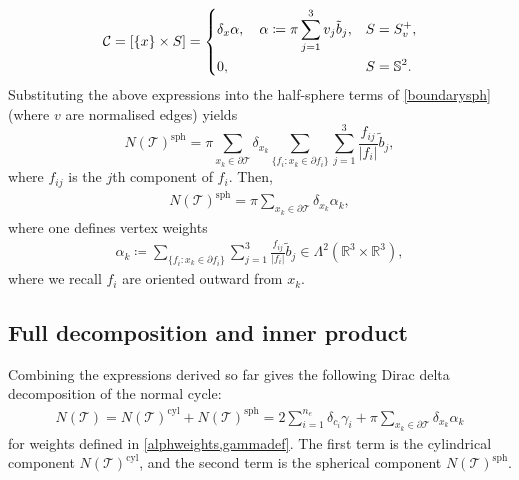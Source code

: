 \documentclass[sn-mathphys-num]{sn-jnl}%
\theoremstyle{thmstyleone}%
\theoremstyle{thmstyletwo}%
\theoremstyle{thmstylethree}%
\numberwithin{remark}{section}
\numberwithin{definition}{section}
\numberwithin{equation}{section}
\numberwithin{theorem}{section}
\newcommand{\R}{\ensuremath{\mathbb{R}}}%
\begin{document}
\begin{gather*}
    \mathcal{C} = [\{x\}\times S] = \begin{dcases}
        \delta_{x}\alpha ,\quad \alpha\coloneq \pi \sum_{j=1}^{3}v_{j}\tilde{b}_{j}, & S=S_{v}^{+},\\ 0 , & S=\mathbb{S}^{2}.
		 \end{dcases} 
\end{gather*}
 Substituting the above expressions into the half-sphere terms of \cref{boundarysph} (where $v$ are normalised edges) yields
\[
N(\mathcal{T})^{\mathrm{sph}} = \pi\sum_{x_{k} \in \partial \mathcal{T }}\delta_{x_{k}} \sum_{\{f_{i}\colon x_k\in \partial f_i\}}\sum_{j=1}^{3}{\frac{f_{ij}}{\lvert f_{i} \rvert} }\tilde{b}_{j}, 
\]
where $f_{ij}$ is the $j$th component of $f_i$. Then,
\begin{align*}
  N(\mathcal{T})^{\mathrm{sph}}  =  \pi\sum_{x_{k} \in \partial \mathcal{T }}\delta_{x_{k}}{\alpha_{k}} ,
\end{align*}
where one defines vertex weights
\begin{align}\label{alphweights}
\alpha_{k} \coloneq \sum_{\{f_{i}\colon x_k\in \partial f_i\}}\sum_{j=1}^{3}{\frac{f_{ij}}{\lvert f_{i} \rvert} }\tilde{b}_{j} \in \Lambda^{2}(\R^{3}\times \R^{3}),
\end{align}
where we recall $f_{i}$ are oriented outward from $x_{k}$.
\subsection{Full decomposition and inner product}
Combining the expressions derived so far gives the following Dirac delta decomposition of the normal cycle:
\begin{align*}
    N(\mathcal{T}) = N(\mathcal{T})^{\mathrm{cyl}} + N(\mathcal{T})^{\mathrm{sph}} = 2 \sum_{i=1}^{n_{e}}{\delta_{c_{i}}\gamma_{i}} +  \pi\sum_{x_{k} \in \partial \mathcal{T }}\delta_{x_{k}}{\alpha_{k}}
\end{align*}
for weights defined in \cref{alphweights,gammadef}. The first term is the cylindrical component $N(\mathcal{T})^{\mathrm{cyl}}$, and the second term is the spherical component $N(\mathcal{T})^{\mathrm{sph}}$.
\end{document}
